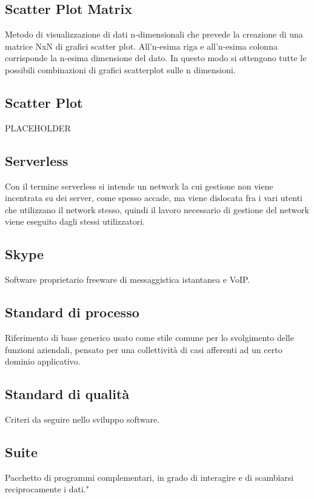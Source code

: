 \documentclass[../glossario.tex]{subfiles}
\begin{document}
\subsection*{Scatter Plot Matrix}
Metodo di visualizzazione di dati n-dimensionali che prevede la creazione di una matrice NxN di grafici scatter plot. All’n-esima riga e all’n-esima colonna corrisponde la n-esima dimensione del dato. In questo modo si ottengono tutte le possibili combinazioni di grafici scatterplot sulle n dimensioni.

\subsection*{Scatter Plot} 
PLACEHOLDER


\subsection*{Serverless} 
Con il termine serverless si intende un network la cui gestione non viene incentrata su dei server, come spesso accade, ma viene dislocata fra i vari utenti che utilizzano il network stesso, quindi il lavoro necessario di gestione del network viene eseguito dagli stessi utilizzatori.

\subsection*{Skype} 
Software proprietario freeware di messaggistica istantanea e VoIP.

\subsection*{Standard di processo} 
Riferimento di base generico usato come stile comune per lo svolgimento delle funzioni aziendali, pensato per una collettività di casi afferenti ad un certo dominio applicativo.

\subsection*{Standard di qualità} 
Criteri da seguire nello sviluppo software.


\subsection*{Suite} 
Pacchetto di programmi complementari, in grado di interagire e di scambiarsi reciprocamente i dati."

    
\end{document}
